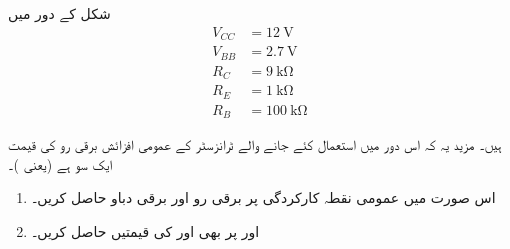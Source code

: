  
شکل  کے دور میں
\begin{align*} 
V_{CC}&=\SI{12}{\volt}\\ 
V_{BB}&=\SI{2.7}{\volt}\\ 
R_C&=\SI{9}{\kilo \ohm}\\ 
R_E&=\SI{1}{\kilo \ohm} \\ 
R_B &=\SI{100}{\kilo \ohm}  
\end{align*}

ہیں۔ مزید یہ کہ اس دور میں استعمال کئے جانے والے ٹرانزسٹر کے عمومی افزائش برقی رو   کی قیمت ایک سو ہے (یعنی )۔

\begin{enumerate}
\item
اس صورت میں عمومی نقطہ کارکردگی پر برقی رو  اور برقی دباو   حاصل کریں۔
\item
{} اور  پر بھی  اور  کی قیمتیں حاصل کریں۔
\end{enumerate}

